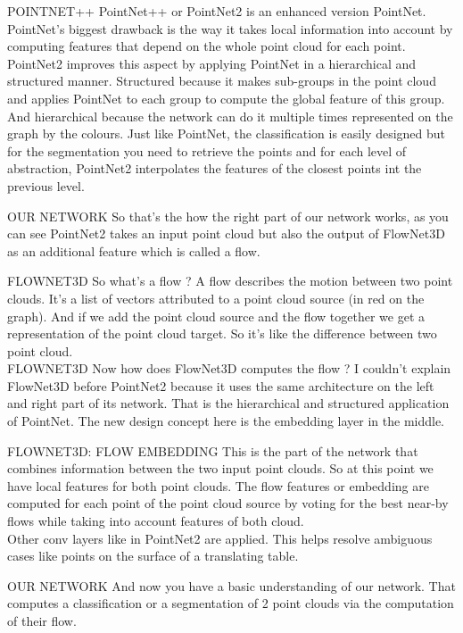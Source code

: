 POINTNET++
PointNet++ or PointNet2 is an enhanced version PointNet. PointNet's biggest drawback is the way it takes local information into account by computing features that depend on the whole point cloud for each point. PointNet2 improves this aspect by applying PointNet in a hierarchical and structured manner. Structured because it makes sub-groups in the point cloud and applies PointNet to each group to compute the global feature of this group. And hierarchical because the network can do it multiple times represented on the graph by the colours. Just like PointNet, the classification is easily designed but for the segmentation you need to retrieve the points and for each level of abstraction, PointNet2 interpolates the features of the closest points int the previous level.

OUR NETWORK
So that's the how the right part of our network works, as you can see PointNet2 takes an input point cloud but also the output of FlowNet3D as an additional feature which is called a flow.

FLOWNET3D
So what's a flow ? A flow describes the motion between two point clouds. It's a list of vectors attributed to a point cloud source (in red on the graph). And if we add the point cloud source and the flow together we get a representation of the point cloud target. So it's like the difference between two point cloud.\\
FLOWNET3D
Now how does FlowNet3D computes the flow ? I couldn't explain FlowNet3D before PointNet2 because it uses the same architecture on the left and right part of its network. That is the hierarchical and structured application of PointNet. The new design concept here is the embedding layer in the middle.

FLOWNET3D: FLOW EMBEDDING
This is the part of the network that combines information between the two input point clouds. So at this point we have local features for both point clouds. The flow features or embedding are computed for each point of the point cloud source by voting for the best near-by flows while taking into account features of both cloud.\\
Other conv layers like in PointNet2 are applied. This helps resolve ambiguous cases like points on the surface of a translating table.

OUR NETWORK
And now you have a basic understanding of our network. That computes a classification or a segmentation of 2 point clouds via the computation of their flow.



